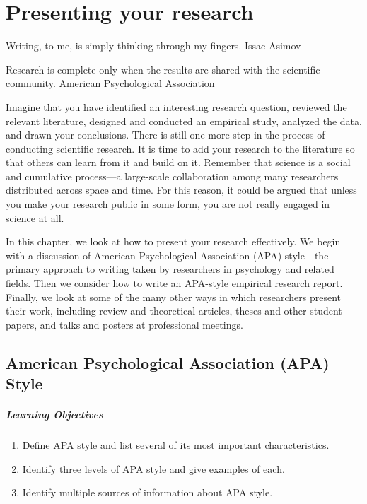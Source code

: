 \chapter{Presenting your research}

Writing, to me, is simply thinking through my fingers.
Issac Asimov

Research is complete only when the results are shared with the scientific community.
American Psychological Association


Imagine that you have identified an interesting research question, reviewed the relevant literature, designed and conducted an empirical study, analyzed the data, and drawn your conclusions. There is still one more step in the process of conducting scientific research. It is time to add your research to the literature so that others can learn from it and build on it. Remember that science is a social and cumulative process---a large-scale collaboration among many researchers distributed across space and time. For this reason, it could be argued that unless you make your research public in some form, you are not really engaged in science at all.

In this chapter, we look at how to present your research effectively. We begin with a discussion of American Psychological Association (APA) style---the primary approach to writing taken by researchers in psychology and related fields. Then we consider how to write an APA-style empirical research report. Finally, we look at some of the many other ways in which researchers present their work, including review and theoretical articles, theses and other student papers, and talks and posters at professional meetings.


\section{American Psychological Association (APA) Style}

\paragraph{Learning Objectives}
    \begin{enumerate}
    \item   Define APA style and list several of its most important characteristics.
\item Identify three levels of APA style and give examples of each.
\item  Identify multiple sources of information about APA style.

      \end{enumerate}


